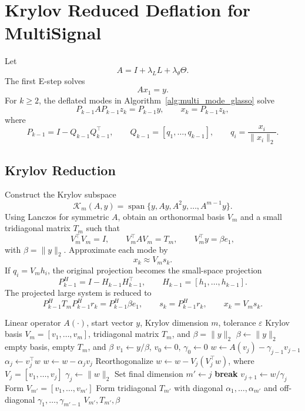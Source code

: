 \section{Krylov Reduced Deflation for MultiSignal}

Let
\[
A = I + \lambda_L L + \lambda_\theta \Theta .
\]
The first E-step solves
\[
A x_1 = y .
\]
For \(k \ge 2\), the deflated modes in Algorithm~\ref{alg:multi_mode_glasso}
solve
\[
P_{k-1} A P_{k-1} z_k = P_{k-1} y,
\qquad
x_k = P_{k-1}z_k,
\]
where
\[
P_{k-1}=I-Q_{k-1}Q_{k-1}^{\top},
\qquad
Q_{k-1}=[q_1,\ldots,q_{k-1}],
\qquad
q_i=\frac{x_i}{\|x_i\|_2}.
\]

\subsection{Krylov Reduction}

Construct the Krylov subspace
\[
\mathcal K_m(A,y)
=
\operatorname{span}\{y,Ay,A^2y,\ldots,A^{m-1}y\}.
\]
Using Lanczos for symmetric \(A\), obtain an orthonormal basis \(V_m\)
and a small tridiagonal matrix \(T_m\) such that
\[
V_m^{\top}V_m=I,
\qquad
V_m^{\top}AV_m=T_m,
\qquad
V_m^{\top}y=\beta e_1,
\]
with \(\beta=\|y\|_2\).
Approximate each mode by
\[
x_k \approx V_m s_k .
\]
If \(q_i=V_m h_i\), the original projection becomes the small-space
projection
\[
P^H_{k-1}=I-H_{k-1}H_{k-1}^{\top},
\qquad
H_{k-1}=[h_1,\ldots,h_{k-1}].
\]
The projected large system is reduced to
\[
P^H_{k-1}T_mP^H_{k-1}r_k
=
P^H_{k-1}\beta e_1,
\qquad
s_k=P^H_{k-1}r_k,
\qquad
x_k=V_m s_k .
\]

\begin{algorithm}[H]
\caption{\(m\)-step Lanczos construction using an operator}
\label{alg:operator_lanczos}
\begin{algorithmic}[1]
\Require Linear operator \(A(\cdot)\), start vector \(y\), Krylov dimension \(m\),
tolerance \(\varepsilon\)
\Ensure Krylov basis \(V_m=[v_1,\ldots,v_m]\), tridiagonal matrix \(T_m\),
and \(\beta=\|y\|_2\)
\State \(\beta\gets\|y\|_2\)
\If{\(\beta\le\varepsilon\)}
    \State \Return empty basis, empty \(T_m\), and \(\beta\)
\EndIf
\State \(v_1\gets y/\beta\), \quad \(v_0\gets 0\), \quad \(\gamma_0\gets 0\)
    \State \(w\gets A(v_j)-\gamma_{j-1}v_{j-1}\)
    \State \(\alpha_j\gets v_j^{\top}w\)
    \State \(w\gets w-\alpha_jv_j\)
    \State Reorthogonalize \(w\gets w-V_j(V_j^{\top}w)\), where
    \(V_j=[v_1,\ldots,v_j]\)
    \State \(\gamma_j\gets\|w\|_2\)
        \State Set final dimension \(m'\gets j\)
        \State \textbf{break}
    \EndIf
    \State \(v_{j+1}\gets w/\gamma_j\)
\EndFor
\State Form \(V_{m'}=[v_1,\ldots,v_{m'}]\)
\State Form tridiagonal \(T_{m'}\) with diagonal
\(\alpha_1,\ldots,\alpha_{m'}\) and off-diagonal
\(\gamma_1,\ldots,\gamma_{m'-1}\)
\State \Return \(V_{m'},T_{m'},\beta\)
\end{algorithmic}
\end{algorithm}

